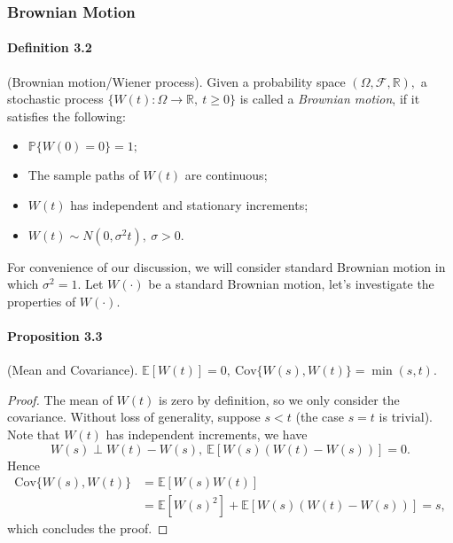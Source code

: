 \documentclass{article}
\begin{document}
\subsubsection{Brownian Motion}
\paragraph{Definition 3.2} (Brownian motion/Wiener process). Given a probability space $(\Omega,\mathcal{F},\mathbb{R}),$ a stochastic process $\lbrace W(t): \Omega\to\mathbb{R},\ t\geq 0\rbrace$ is called a \textit{Brownian motion}, if it satisfies the following:
\begin{itemize}
	\vspace{0.1cm}
	\item $\mathbb{P}\lbrace W(0) = 0\rbrace = 1;$
	\vspace{0.1cm}
	\item The sample paths of $W(t)$ are continuous;
	\vspace{0.1cm}
	\item $W(t)$ has independent and stationary increments;
	\vspace{0.1cm}
	\item $W(t)\sim N(0,\sigma^2t),\ \sigma > 0.$
\end{itemize}
For convenience of our discussion, we will consider standard Brownian motion in which $\sigma^2=1.$ Let $W(\cdot)$ be a standard Brownian motion, let's investigate the properties of $W(\cdot).$

\paragraph{Proposition 3.3} (Mean and Covariance). $\mathbb{E}[W(t)] = 0,\ \mathrm{Cov}\lbrace W(s),W(t)\rbrace = \min(s,t).$
\begin{proof}
The mean of $W(t)$ is zero by definition, so we only consider the covariance. Without loss of generality, suppose $s<t$ (the case $s = t$ is trivial). Note that $W(t)$ has independent increments, we have
\begin{equation*}
	W(s)\perp W(t) - W(s),\ \mathbb{E}\left[W(s)\left(W(t)-W(s)\right)\right] = 0.\tag{3.8}
\end{equation*}
Hence
\begin{align*}
	\mathrm{Cov}\lbrace W(s),W(t)\rbrace &= \mathbb{E}[W(s)W(t)]\\
	&= \mathbb{E}[W(s)^2] + \mathbb{E}[W(s)(W(t)-W(s))] = s,\tag{3.9}
\end{align*}
which concludes the proof.
\end{proof}
\end{document}
